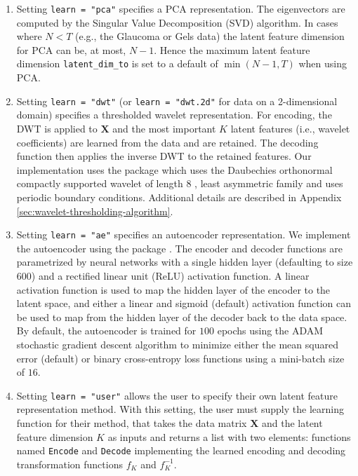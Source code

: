 \begin{enumerate}
    \item Setting \texttt{learn = "pca"} specifies a PCA representation. The eigenvectors are computed by the Singular Value Decomposition (SVD) algorithm. In cases where $N < T$ (e.g., the Glaucoma or Gels data) the latent feature dimension for PCA can be, at most, $N-1$. Hence the maximum latent feature dimension \texttt{latent\_dim\_to} is set to a default of $\min(N-1, T)$ when using PCA.
    \item Setting \texttt{learn = "dwt"} (or \texttt{learn = "dwt.2d"} for data on a 2-dimensional domain) specifies a thresholded wavelet representation. For encoding, the DWT is applied to $\mathbf{X}$ and the most important $K$ latent features (i.e., wavelet coefficients) are learned from the data and are retained. The decoding function then applies the inverse DWT to the retained features. Our implementation uses the   package \parencite{whitcher_waveslim_2024} which uses the Daubechies orthonormal compactly supported wavelet of length $8$ \parencite{daubechies_ten_1992}, least asymmetric family and uses periodic boundary conditions. Additional details are described in Appendix \ref{sec:wavelet-thresholding-algorithm}.
    \item Setting \texttt{learn = "ae"} specifies an autoencoder representation. We implement the autoencoder using the   package \parencite{kalinowski_keras_2024}. The encoder and decoder functions are parametrized by neural networks with a single hidden layer (defaulting to size $600$) and a rectified linear unit (ReLU) activation function.
    A linear activation function is used to map the hidden layer of the encoder to the latent space, and either a linear and sigmoid (default) activation function can be used to map from the hidden layer of the decoder back to the data space.
    By default, the autoencoder is trained for $100$ epochs using the ADAM stochastic gradient descent algorithm \parencite{kingma_adam_2017} to minimize either the mean squared error (default) or binary cross-entropy loss functions using a mini-batch size of $16$.
    \item Setting \texttt{learn = "user"} allows the user to specify their own latent feature representation method. With this setting, the user must supply the learning function for their method, that takes the data matrix $\mathbf{X}$ and the latent feature dimension $K$ as inputs and returns a list with two elements: functions named \texttt{Encode} and \texttt{Decode} implementing the learned encoding and decoding transformation functions $f_K$ and $f_K^{-1}$. 
\end{enumerate}

